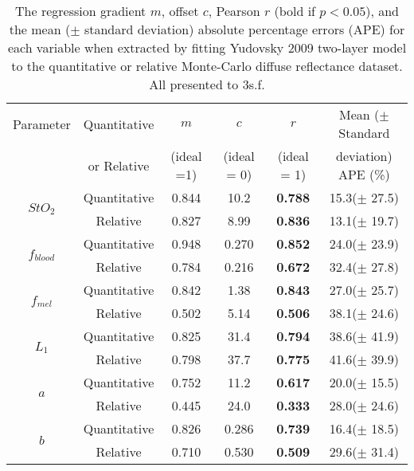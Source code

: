 \begin{table}[t]
    \centering
    \caption{The regression gradient $m$, offset $c$, Pearson $r$ (bold if $p<0.05$), and the mean ($\pm$ standard deviation) absolute percentage errors (APE) for each variable when extracted by fitting Yudovsky 2009 two-layer model to the quantitative or relative Monte-Carlo diffuse reflectance dataset. All presented to 3s.f.}
    \begin{tabular}{|c|c|cccc|}
        \hline
        Parameter & Quantitative & $m$ & $c$ & $r$ & Mean ($\pm$ Standard  \\
        & or Relative & (ideal =1) & (ideal = 0) & (ideal = 1) & deviation) APE (\%)\\
        \hline
        \multirow{2}{*}{$StO_2$} & Quantitative & 0.844 & 10.2 & \textbf{0.788} & 15.3($\pm$ 27.5) \\
        & Relative & 0.827 & 8.99 & \textbf{0.836} & 13.1($\pm$ 19.7) \\
        \hline
        \multirow{2}{*}{$f_{blood}$} & Quantitative & 0.948 & 0.270 & \textbf{0.852} & 24.0($\pm$ 23.9) \\
        & Relative & 0.784 & 0.216 & \textbf{0.672} & 32.4($\pm$ 27.8) \\
        \hline
        \multirow{2}{*}{$f_{mel}$} & Quantitative & 0.842 & 1.38 & \textbf{0.843} & 27.0($\pm$ 25.7) \\
        & Relative & 0.502 & 5.14 & \textbf{0.506} & 38.1($\pm$ 24.6) \\
        \hline
        \multirow{2}{*}{$L_1$} & Quantitative & 0.825 & 31.4 & \textbf{0.794} & 38.6($\pm$ 41.9) \\
         & Relative & 0.798 & 37.7 & \textbf{0.775} & 41.6($\pm$ 39.9) \\
        \hline
        \multirow{2}{*}{$a$} & Quantitative & 0.752 & 11.2 & \textbf{0.617} & 20.0($\pm$ 15.5) \\
        & Relative & 0.445 & 24.0 & \textbf{0.333} & 28.0($\pm$ 24.6) \\
        \hline
        \multirow{2}{*}{$b$} & Quantitative & 0.826 & 0.286 & \textbf{0.739} & 16.4($\pm$ 18.5) \\
        & Relative & 0.710 & 0.530 & \textbf{0.509} & 29.6($\pm$ 31.4) \\
        \hline
    \end{tabular}
    \label{tb:doubleparamtrends}
\end{table}
